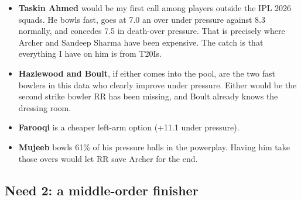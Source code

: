 \documentclass[10.5pt,a4paper]{article}
\begin{document}
\begin{itemize}
\item \textbf{Taskin Ahmed} would be my first call among players outside the IPL 2026 squads. He bowls fast, goes at 7.0 an over under pressure against 8.3 normally, and concedes 7.5 in death-over pressure. That is precisely where Archer and Sandeep Sharma have been expensive. The catch is that everything I have on him is from T20Is.
\item \textbf{Hazlewood and Boult}, if either comes into the pool, are the two fast bowlers in this data who clearly improve under pressure. Either would be the second strike bowler RR has been missing, and Boult already knows the dressing room.
\item \textbf{Farooqi} is a cheaper left-arm option (+11.1 under pressure).
\item \textbf{Mujeeb} bowls 61\% of his pressure balls in the powerplay. Having him take those overs would let RR save Archer for the end.
\end{itemize}

\subsection{Need 2: a middle-order finisher}

\begin{table}[H]\centering
{}
\end{table}
\end{document}
